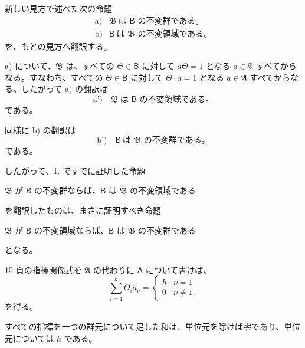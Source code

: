 新しい見方で述べた次の命題
\[
\begin{array}{ll}
\text{a)}& \mathfrak B\ \text{は }\mathsf B\text{ の不変群である。}\\
\text{b)}& \mathsf B\ \text{は }\mathfrak B\text{ の不変領域である。}
\end{array}
\]
を、もとの見方へ翻訳する。

a) について、$\mathfrak B$ は、すべての $\Theta\in\mathsf B$ に対して $a\Theta=1$ となる $a\in\mathfrak A$ すべてからなる。すなわち、すべての $\Theta\in\mathsf B$ に対して $\Theta\cdot a=1$ となる $a\in\mathfrak A$ すべてからなる。したがって a) の翻訳は
\[
\text{a')} \quad \mathfrak B\ \text{は }\mathsf B\text{ の不変領域である。}
\]
である。

同様に b) の翻訳は
\[
\text{b')} \quad \mathsf B\ \text{は }\mathfrak B\text{ の不変群である。}
\]
である。

したがって、1. ですでに証明した命題

$\mathfrak B$ が $\mathsf B$ の不変群ならば、$\mathsf B$ は $\mathfrak B$ の不変領域である

を翻訳したものは、まさに証明すべき命題

$\mathfrak B$ が $\mathsf B$ の不変領域ならば、$\mathsf B$ は $\mathfrak B$ の不変群である

となる。

15 頁の指標関係式を $\mathfrak A$ の代わりに $\mathsf A$ について書けば、
\[
\sum_{i=1}^{h} \Theta_i a_\nu =
\begin{cases}
h & \nu=1\\
0 & \nu\ne 1.
\end{cases}
\]
を得る。

すべての指標を一つの群元について足した和は、単位元を除けば零であり、単位元については $h$ である。

